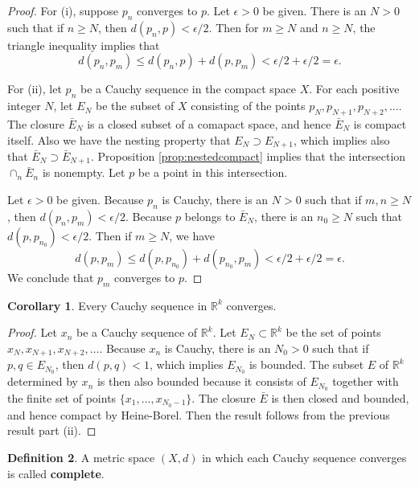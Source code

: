 \documentclass[12pt]{article}
\theoremstyle{definition}
\newtheorem{definition}{Definition}
\theoremstyle{theorem}
\newtheorem{corollary}[definition]{Corollary}
\begin{document}
\begin{proof}
For (i), suppose $p_n$ converges to $p$. Let  $\epsilon > 0$ be given. There is an $N > 0$ such that if $n \geqslant N$, then $d(p_n,p) < \epsilon/2$. Then for $m \geqslant N$ and $n \geqslant N$, the triangle inequality implies that 
\[
d(p_n, p_m) \leqslant d(p_n, p) + d(p, p_m) < \epsilon/2 + \epsilon/2 = \epsilon.
\]

For (ii), let $p_n$ be a Cauchy sequence in the compact space $X$. For each positive integer $N$, let $E_N$ be the subset of $X$ consisting of the points $p_N, p_{N+1}, p_{N+2}, \ldots$. The closure $\bar{E}_N$ is a closed subset of a comapact space, and hence $\bar{E}_N$ is compact itself. Also we have the nesting property that $E_{N} \supset E_{N+1}$, which implies also that $\bar{E}_{N} \supset \bar{E}_{N+1}$. Proposition \ref{prop:nestedcompact} implies that the intersection $\cap_n \bar{E}_n$ is nonempty. Let $p$ be a point in this intersection. 

Let $\epsilon > 0$ be given. Because $p_n$ is Cauchy, there is an $N > 0$ such that if $m,n \geqslant N$, then $d(p_n,p_m) < \epsilon/2$. Because $p$ belongs to $\bar{E}_{N}$, there is an $n_0 \geqslant N$ such that $d(p, p_{n_0}) < \epsilon/2$. Then if $m \geqslant N$, we have 
\[
d(p,p_m) \leqslant d(p, p_{n_0}) + d(p_{n_0}, p_m) < \epsilon/2 + \epsilon/2 = \epsilon.
\]
We conclude that $p_m$ converges to $p$. 
\end{proof}

\begin{corollary}
Every Cauchy sequence in $\mathbb{R}^k$ converges. 
\end{corollary}

\begin{proof}
Let $x_n$ be a Cauchy sequence of $\mathbb{R}^k$. Let $E_N \subset \mathbb{R}^k$ be the set of points $x_N, x_{N+1}, x_{N+2}, \ldots$. Because $x_n$ is Cauchy, there is an $N_0 > 0$ such that if $p,q \in E_{N_0}$, then $d(p,q) < 1$, which implies $E_{N_0}$ is bounded. The subset $E$ of $\mathbb{R}^k$ determined by $x_n$ is then also bounded because it consists of $E_{N_0}$ together with the finite set of points $\{x_1, \ldots, x_{N_0-1}\}$. The closure $\bar{E}$ is then closed and bounded, and hence compact by Heine-Borel. Then the result follows from the previous result part (ii). 
\end{proof}

\begin{definition}
A metric space $(X,d)$ in which each Cauchy sequence converges is called \textbf{complete}. 
\end{definition}
\end{document}
